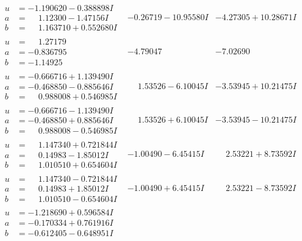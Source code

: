 \documentclass[1p]{elsarticle_modified}
\theoremstyle{definition}
\begin{document}
$$\begin{array}{c|c|c}
\begin{aligned}
u &= -1.190620 - 0.388898 I \\
a &= \phantom{-}1.12300 - 1.47156 I \\
b &= \phantom{-}1.163710 + 0.552680 I\end{aligned}
 & -0.26719 - 10.95580 I & -4.27305 + 10.28671 I \\ \hline\begin{aligned}
u &= \phantom{-}1.27179\phantom{ +0.000000I} \\
a &= -0.836795\phantom{ +0.000000I} \\
b &= -1.14925\phantom{ +0.000000I}\end{aligned}
 & -4.79047\phantom{ +0.000000I} & -7.02690\phantom{ +0.000000I} \\ \hline\begin{aligned}
u &= -0.666716 + 1.139490 I \\
a &= -0.468850 - 0.885646 I \\
b &= \phantom{-}0.988008 + 0.546985 I\end{aligned}
 & \phantom{-}1.53526 - 6.10045 I & -3.53945 + 10.21475 I \\ \hline\begin{aligned}
u &= -0.666716 - 1.139490 I \\
a &= -0.468850 + 0.885646 I \\
b &= \phantom{-}0.988008 - 0.546985 I\end{aligned}
 & \phantom{-}1.53526 + 6.10045 I & -3.53945 - 10.21475 I \\ \hline\begin{aligned}
u &= \phantom{-}1.147340 + 0.721844 I \\
a &= \phantom{-}0.14983 - 1.85012 I \\
b &= \phantom{-}1.010510 + 0.654604 I\end{aligned}
 & -1.00490 - 6.45415 I & \phantom{-}2.53221 + 8.73592 I \\ \hline\begin{aligned}
u &= \phantom{-}1.147340 - 0.721844 I \\
a &= \phantom{-}0.14983 + 1.85012 I \\
b &= \phantom{-}1.010510 - 0.654604 I\end{aligned}
 & -1.00490 + 6.45415 I & \phantom{-}2.53221 - 8.73592 I \\ \hline\begin{aligned}
u &= -1.218690 + 0.596584 I \\
a &= -0.170334 + 0.761916 I \\
b &= -0.612405 - 0.648951 I\end{aligned}

\end{array}$$
\end{document}
